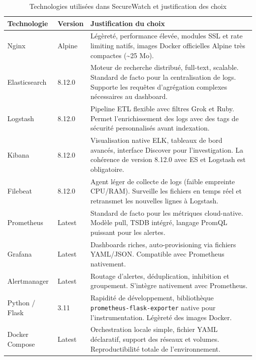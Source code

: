 \documentclass[12pt, a4paper]{report}
\begin{document}
\begin{table}[H]
  \centering
  \caption{Technologies utilisées dans SecureWatch et justification des choix}
  \begin{tabularx}{\textwidth}{@{}llX@{}}
    \toprule
    \textbf{Technologie} & \textbf{Version} & \textbf{Justification du choix} \\
    \midrule
    Nginx               & Alpine  & Légèreté, performance élevée, modules SSL et rate limiting natifs, images Docker officielles Alpine très compactes (\textasciitilde25 Mo). \\
    \addlinespace
    Elasticsearch       & 8.12.0  & Moteur de recherche distribué, full-text, scalable. Standard de facto pour la centralisation de logs. Supporte les requêtes d'agrégation complexes nécessaires au dashboard. \\
    \addlinespace
    Logstash            & 8.12.0  & Pipeline ETL flexible avec filtres Grok et Ruby. Permet l'enrichissement des logs avec des tags de sécurité personnalisés avant indexation. \\
    \addlinespace
    Kibana              & 8.12.0  & Visualisation native ELK, tableaux de bord avancés, interface Discover pour l'investigation. La cohérence de version 8.12.0 avec ES et Logstash est obligatoire. \\
    \addlinespace
    Filebeat            & 8.12.0  & Agent léger de collecte de logs (faible empreinte CPU/RAM). Surveille les fichiers en temps réel et retransmet les nouvelles lignes à Logstash. \\
    \addlinespace
    Prometheus          & Latest  & Standard de facto pour les métriques cloud-native. Modèle pull, TSDB intégré, langage PromQL puissant pour les alertes. \\
    \addlinespace
    Grafana             & Latest  & Dashboards riches, auto-provisioning via fichiers YAML/JSON. Compatible avec Prometheus nativement. \\
    \addlinespace
    Alertmanager        & Latest  & Routage d'alertes, déduplication, inhibition et groupement. S'intègre nativement avec Prometheus. \\
    \addlinespace
    Python / Flask      & 3.11    & Rapidité de développement, bibliothèque \texttt{prometheus-flask-exporter} native pour l'instrumentation. Légèreté des images Docker. \\
    \addlinespace
    Docker Compose      & Latest  & Orchestration locale simple, fichier YAML déclaratif, support des réseaux et volumes. Reproductibilité totale de l'environnement. \\
    \bottomrule
  \end{tabularx}
\end{table}
\end{document}
